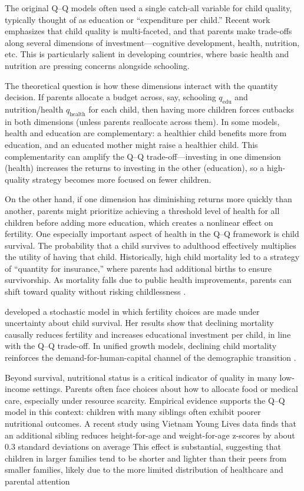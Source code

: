 \documentclass[]{AEA}
\begin{document}
The original Q--Q models often used a single catch-all variable for
child quality, typically thought of as education or ``expenditure per
child.'' Recent work emphasizes that child quality is multi-faceted, and
that parents make trade-offs along several dimensions of
investment---cognitive development, health, nutrition, etc. This is
particularly salient in developing countries, where basic health and
nutrition are pressing concerns alongside schooling.

The theoretical question is how these dimensions interact with the
quantity decision. If parents allocate a budget across, say, schooling
\(q_{\text{edu}}\) and nutrition/health \(q_{\text{health}}\) for each
child, then having more children forces cutbacks in both dimensions
(unless parents reallocate across them). In some models, health and
education are complementary: a healthier child benefits more from
education, and an educated mother might raise a healthier child. This
complementarity can amplify the Q--Q trade-off---investing in one
dimension (health) increases the returns to investing in the other
(education), so a high-quality strategy becomes more focused on fewer
children.

On the other hand, if one dimension has diminishing returns more quickly
than another, parents might prioritize achieving a threshold level of
health for all children before adding more education, which creates a
nonlinear effect on fertility. One especially important aspect of health
in the Q--Q framework is child survival. The probability that a child
survives to adulthood effectively multiplies the utility of having that
child. Historically, high child mortality led to a strategy of
``quantity for insurance,'' where parents had additional births to
ensure survivorship. As mortality falls due to public health
improvements, parents can shift toward quality without risking
childlessness \citep{kalemli2002does, kalemli2000mortality}.

\citet{kalemli2002does} developed a stochastic model in which fertility
choices are made under uncertainty about child survival. Her results
show that declining mortality causally reduces fertility and increases
educational investment per child, in line with the Q--Q trade-off. In
unified growth models, declining child mortality reinforces the
demand-for-human-capital channel of the demographic transition
\citep{galor2004physical}.

Beyond survival, nutritional status is a critical indicator of quality
in many low-income settings. Parents often face choices about how to
allocate food or medical care, especially under resource scarcity.
Empirical evidence supports the Q--Q model in this context: children
with many siblings often exhibit poorer nutritional outcomes. A recent
study using Vietnam Young Lives data finds that an additional sibling
reduces height-for-age and weight-for-age z-scores by about 0.3 standard
deviations on average \citep{chen2021population} This effect is
substantial, suggesting that children in larger families tend to be
shorter and lighter than their peers from smaller families, likely due
to the more limited distribution of healthcare and parental attention
\end{document}
